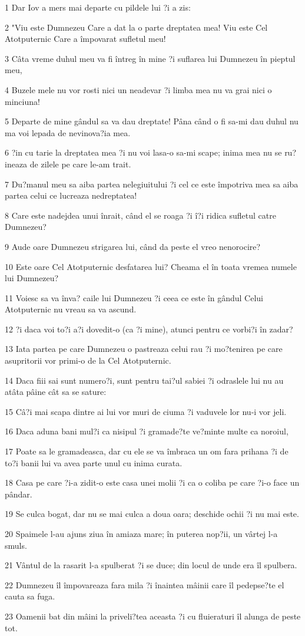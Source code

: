\par 1 Dar Iov a mers mai departe cu pildele lui ?i a zis:
\par 2 "Viu este Dumnezeu Care a dat la o parte dreptatea mea! Viu este Cel Atotputernic Care a împovarat sufletul meu!
\par 3 Câta vreme duhul meu va fi întreg în mine ?i suflarea lui Dumnezeu în pieptul meu,
\par 4 Buzele mele nu vor rosti nici un neadevar ?i limba mea nu va grai nici o minciuna!
\par 5 Departe de mine gândul sa va dau dreptate! Pâna când o fi sa-mi dau duhul nu ma voi lepada de nevinova?ia mea.
\par 6 ?in cu tarie la dreptatea mea ?i nu voi lasa-o sa-mi scape; inima mea nu se ru?ineaza de zilele pe care le-am trait.
\par 7 Du?manul meu sa aiba partea nelegiuitului ?i cel ce este împotriva mea sa aiba partea celui ce lucreaza nedreptatea!
\par 8 Care este nadejdea unui înrait, când el se roaga ?i î?i ridica sufletul catre Dumnezeu?
\par 9 Aude oare Dumnezeu strigarea lui, când da peste el vreo nenorocire?
\par 10 Este oare Cel Atotputernic desfatarea lui? Cheama el în toata vremea numele lui Dumnezeu?
\par 11 Voiesc sa va înva? caile lui Dumnezeu ?i ceea ce este în gândul Celui Atotputernic nu vreau sa va ascund.
\par 12 ?i daca voi to?i a?i dovedit-o (ca ?i mine), atunci pentru ce vorbi?i în zadar?
\par 13 Iata partea pe care Dumnezeu o pastreaza celui rau ?i mo?tenirea pe care asupritorii vor primi-o de la Cel Atotputernic.
\par 14 Daca fiii sai sunt numero?i, sunt pentru tai?ul sabiei ?i odraslele lui nu au atâta pâine cât sa se sature:
\par 15 Câ?i mai scapa dintre ai lui vor muri de ciuma ?i vaduvele lor nu-i vor jeli.
\par 16 Daca aduna bani mul?i ca nisipul ?i gramade?te ve?minte multe ca noroiul,
\par 17 Poate sa le gramadeasca, dar cu ele se va îmbraca un om fara prihana ?i de to?i banii lui va avea parte unul cu inima curata.
\par 18 Casa pe care ?i-a zidit-o este casa unei molii ?i ca o coliba pe care ?i-o face un pândar.
\par 19 Se culca bogat, dar nu se mai culca a doua oara; deschide ochii ?i nu mai este.
\par 20 Spaimele l-au ajuns ziua în amiaza mare; în puterea nop?ii, un vârtej l-a smuls.
\par 21 Vântul de la rasarit l-a spulberat ?i se duce; din locul de unde era îl spulbera.
\par 22 Dumnezeu îl împovareaza fara mila ?i înaintea mâinii care îl pedepse?te el cauta sa fuga.
\par 23 Oamenii bat din mâini la priveli?tea aceasta ?i cu fluieraturi îl alunga de peste tot.

